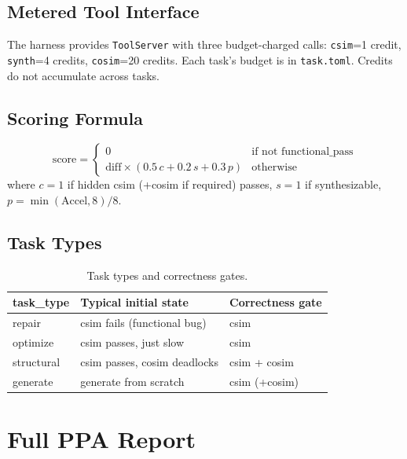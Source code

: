 \documentclass[10pt,conference,letterpaper]{IEEEtran}
\begin{document}
\subsection{Metered Tool Interface}

The harness provides \texttt{ToolServer} with three budget-charged calls: \texttt{csim}=1 credit, \texttt{synth}=4 credits, \texttt{cosim}=20 credits. Each task's budget is in \texttt{task.toml}. Credits do not accumulate across tasks.

\subsection{Scoring Formula}

\begin{equation}
\label{eq:score}
\text{score} = \begin{cases}
0 & \text{if not functional\_pass} \\
\text{diff} \times (0.5\,c + 0.2\,s + 0.3\,p) & \text{otherwise}
\end{cases}
\end{equation}
where $c=1$ if hidden csim (+cosim if required) passes, $s=1$ if synthesizable, $p = \min(\text{Accel}, 8)/8$.

\subsection{Task Types}

\begin{table}[h]
\centering
\caption{Task types and correctness gates.}
\label{tab:tasktypes}
\small
\begin{tabular}{lll}
\toprule
\textbf{task\_type} & \textbf{Typical initial state} & \textbf{Correctness gate} \\
\midrule
repair & csim fails (functional bug) & csim \\
optimize & csim passes, just slow & csim \\
structural & csim passes, cosim deadlocks & csim + cosim \\
generate & generate from scratch & csim (+cosim) \\
\bottomrule
\end{tabular}
\end{table}

\section{Full PPA Report}
\label{app:ppa}
\end{document}
